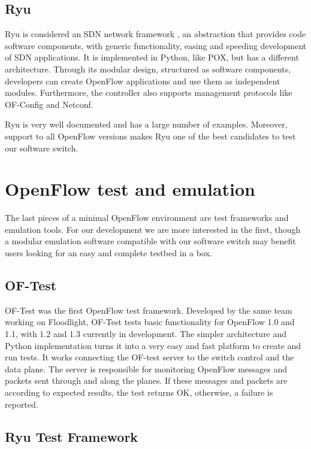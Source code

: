     \subsection{Ryu}
    
    Ryu is considered an SDN network framework \cite{ryu}, an abstraction that provides code software components, with generic functionality, easing and speeding development of SDN applications. It is implemented in Python, like POX, but has a different architecture. Through its modular design, structured as software components, developers can create OpenFlow applications and use them as independent modules. Furthermore, the controller also supports management protocols like OF-Config and Netconf.
    
    Ryu is very well documented and has a large number of examples. Moreover, support to all OpenFlow versions makes Ryu one of the best candidates to test our software switch.
 
\section{OpenFlow test and emulation}
\label{sec:testemulation}
    The last pieces of a minimal OpenFlow environment are  test frameworks and emulation tools. For our development we are more interested in the first, though a modular emulation software compatible with our software switch may benefit users looking for an easy and complete testbed in a box. 
    
    \subsection{OF-Test}
    
    OF-Test was the first OpenFlow test framework. Developed by the same team working on Floodlight, OF-Test \cite{oftest} tests basic functionality for OpenFlow 1.0 and 1.1, with 1.2 and 1.3 currently in development. The simpler architecture and Python implementation turns it into a very easy and fast platform to create and run tests. It works connecting the OF-test server to the switch control and the data plane. The server is responsible for monitoring OpenFlow messages and packets sent through and along the planes. If these messages and packets are according to expected results, the test returns OK, otherwise, a failure is reported.
    
    \subsection{Ryu Test Framework}
    
